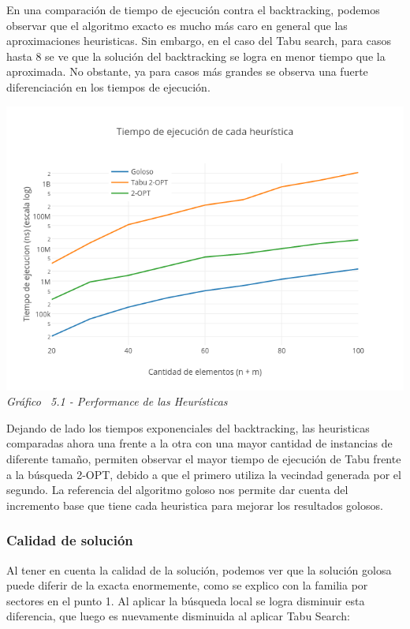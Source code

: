 En una comparación de tiempo de ejecución contra el backtracking, podemos observar que el algoritmo exacto es mucho más caro en general que las aproximaciones heuristicas. Sin embargo, en el caso del Tabu search, para casos hasta 8 se ve que la solución del backtracking se logra en menor tiempo que la aproximada. No obstante, ya para casos más grandes se observa una fuerte diferenciación en los tiempos de ejecución.

\vspace*{0.3cm} \vspace*{0.3cm}
  \begin{center}
 \includegraphics[scale=0.5]{./EJ5/medicion.png}\\
 {\textit{Gráfico \ 5.1 - Performance de las Heur\'isticas}}
  \end{center}
  \vspace*{0.3cm}

Dejando de lado los tiempos exponenciales del backtracking, las heuristicas comparadas ahora una frente a la otra con una mayor cantidad de instancias de diferente tamaño, permiten observar el mayor tiempo de ejecución de Tabu frente a la búsqueda 2-OPT, debido a que el primero utiliza la vecindad generada por el segundo. La referencia del algoritmo goloso nos permite dar cuenta del incremento base que tiene cada heuristica para mejorar los resultados golosos.

\subsubsection*{Calidad de solución}

Al tener en cuenta la calidad de la solución, podemos ver que la solución golosa puede diferir de la exacta enormemente, como se explico con la familia por sectores en el punto 1. Al aplicar la búsqueda local se logra disminuir esta diferencia, que luego es nuevamente disminuida al aplicar Tabu Search:

